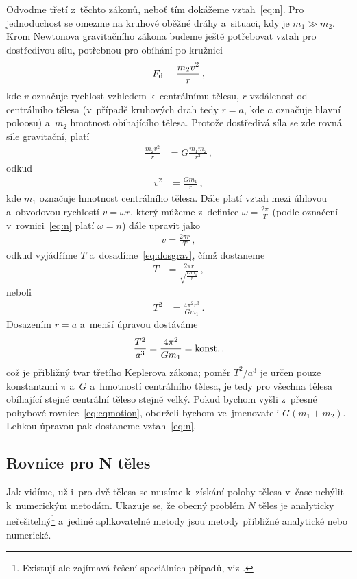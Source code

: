 \documentclass[A4paper, 12pt, oneside, openany]{book}
\begin{document}
Odvoďme třetí z~těchto zákonů, neboť tím dokážeme vztah~\eqref{eq:n}. Pro jednoduchost se omezme na kruhové oběžné dráhy a~situaci, kdy je $m_1 \gg m_2$. Krom Newtonova gravitačního zákona budeme ještě potřebovat vztah pro dostředivou sílu, potřebnou pro obíhání po kružnici
\begin{align}
	F_{\rm d}=\frac{m_2v^2}{r}\,,
\end{align}
kde $v$ označuje rychlost vzhledem k~centrálnímu tělesu, $r$ vzdálenost od centrálního tělesa (v~případě kruhových drah tedy $r=a$, kde $a$ označuje hlavní poloosu) a~$m_2$ hmotnost obíhajícího tělesa. Protože dostředivá síla se zde rovná síle gravitační, platí
\begin{align}
	\frac{m_2v^2}{r}&=G\frac{m_1m_2}{r^2}\,,
\end{align}
	odkud
\begin{align}
	v^2&=\frac{Gm_1}{r}\,, \label{eq:dosgrav}
\end{align}
kde $m_1$ označuje hmotnost centrálního tělesa. Dále platí vztah mezi úhlovou a~obvodovou rychlostí $v=\omega r$, který můžeme z~definice $\omega=\frac{2\pi}{T}$ (podle označení v~rovnici~\eqref{eq:n} platí $\omega=n$) dále upravit jako
\begin{align}
	v=\frac{2\pi r}{T}\,,
\end{align}
odkud vyjádříme $T$ a~dosadíme~\eqref{eq:dosgrav}, čímž dostaneme
\begin{align}
	T&=\frac{2\pi r}{\sqrt{\frac{Gm_1}{r}}}\,,
\end{align}
	neboli
\begin{align}
	T^2&=\frac{4\pi^2 r^3}{Gm_1}\,.
\end{align}
Dosazením $r=a$ a~menší úpravou dostáváme
\begin{align}
	\frac{T^2}{a^3}=\frac{4\pi^2}{Gm_1}={\rm konst.}\,,
\end{align}
což je přibližný tvar třetího Keplerova zákona; poměr $T^2/a^3$ je určen pouze konstantami $\pi$ a~$G$ a~hmotností centrálního tělesa, je tedy pro všechna tělesa obíhající stejné centrální těleso stejně velký. Pokud bychom vyšli z~přesné pohybové rovnice~\eqref{eq:eqmotion}, obdrželi bychom ve~jmenovateli $G(m_1+m_2)$. Lehkou úpravou pak dostaneme vztah~\eqref{eq:n}.

\subsection{Rovnice pro N těles}
Jak vidíme, už i~pro dvě tělesa se musíme k~získání polohy tělesa v~čase uchýlit k~numerickým metodám. Ukazuje se, že obecný problém $N$ těles je analyticky neřešitelný\footnote{Existují ale zajímavá řešení speciálních případů, viz \cite{cohan12}.} a~jediné aplikovatelné metody jsou metody přibližné analytické nebo numerické.
\end{document}

